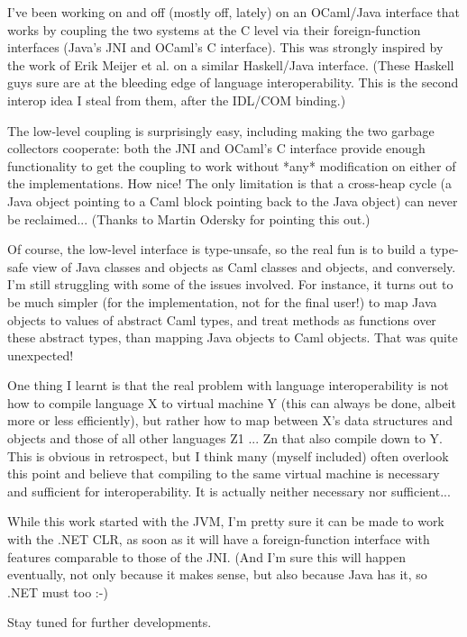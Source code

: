 \documentclass[acmsmall,screen]{acmart}
\begin{document}
\begin{verbquote}
I've been working on and off (mostly off, lately) on an OCaml/Java interface that works by coupling the two systems at the C level via their foreign-function interfaces (Java's JNI and OCaml's C interface).  This was strongly inspired by the work of Erik Meijer et al. on a similar Haskell/Java interface.  (These Haskell guys sure are at the bleeding edge of language interoperability.  This is the second interop idea I steal from them, after the IDL/COM binding.)

The low-level coupling is surprisingly easy, including making the two garbage collectors cooperate: both the JNI and OCaml's C interface provide enough functionality to get the coupling to work without *any* modification on either of the implementations.  How nice! The only limitation is that a cross-heap cycle (a Java object pointing to a Caml block pointing back to the Java object) can never be reclaimed... (Thanks to Martin Odersky for pointing this out.)

Of course, the low-level interface is type-unsafe, so the real fun is to build a type-safe view of Java classes and objects as Caml classes and objects, and conversely.  I'm still struggling with some of the issues involved.  For instance, it turns out to be much simpler (for the implementation, not for the final user!) to map Java objects to values of abstract Caml types, and treat methods as functions over these abstract types, than mapping Java objects to Caml objects.  That was quite unexpected!

One thing I learnt is that the real problem with language interoperability is not how to compile language X to virtual machine Y (this can always be done, albeit more or less efficiently), but rather how to map between X's data structures and objects and those of all other languages Z1 ... Zn that also compile down to Y.  This is obvious in retrospect, but I think many (myself included) often overlook this point and believe that compiling to the same virtual machine is necessary and sufficient for interoperability.  It is actually neither necessary nor sufficient...

While this work started with the JVM, I'm pretty sure it can be made to work with the .NET CLR, as soon as it will have a foreign-function interface with features comparable to those of the JNI.  (And I'm sure this will happen eventually, not only because it makes sense, but also because Java has it, so .NET must too :-)

Stay tuned for further developments.
\end{verbquote}
\end{document}
